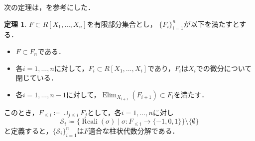 \documentclass[uplatex, dvipdfmx]{jsarticle}
\numberwithin{equation}{section}
\newcommand{\map}[3]{{#1}\colon{#2}\rightarrow{#3}}
\DeclareMathOperator{\Elim}{Elim}
\DeclareMathOperator{\Reali}{Reali}
\theoremstyle{definition}
\newtheorem{theorem}[definition]{定理}
\begin{document}
次の定理は，\cite[Theorem 5.34.]{MR2248869}を参考にした．
\begin{theorem}
     $F \subset R[X_1, \dots, X_n]$を有限部分集合とし，
     $\{F_i\}_{i=1}^n$が以下を満たすとする．
     \begin{itemize}
          \item $F \subset F_n$である．\\
          \item 各$i=1,\dots, n$に対して，$F_i \subset R[X_1, \dots, X_i]$であり，$F_i$は$X_i$での微分について閉じている．\\
          \item 各$i=1, \dots, n-1$に対して，$\Elim_{X_{i+1}}(F_{i+1}) \subset F_i$を満たす．
     \end{itemize}

     このとき，$F_{\leq i}\coloneqq \cup_{j \leq i} F_j$として，各$i=1, \dots, n$に対し
     \begin{equation}
          \mathcal{S}_i \coloneqq \{\Reali(\sigma) \mid \map{\sigma}{F_{\leq i}}{\{-1,0,1\}}\} \setminus \{\emptyset\}
     \end{equation}          
     と定義すると，$\{\mathcal{S}_i\}_{i=1}^n$は$F$適合な柱状代数分解である．
\end{theorem}
\end{document}
